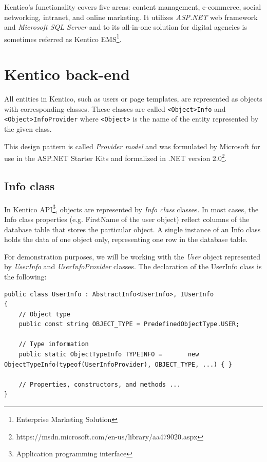 \documentclass[
  print,
  table,
  nolof,
  nolot,
  nocover,
  oneside
]{fithesis3}
\begin{document}
Kentico's functionality covers five areas: content management, e-commerce, social networking, intranet, and online marketing. It utilizes \textit{ASP.NET} web framework and \textit{Microsoft SQL Server} and to its all-in-one solution for digital agencies is sometimes referred as Kentico EMS\footnote{Enterprise Marketing Solution}.


\section{Kentico back-end}
\label{kentico back-end}

All entities in Kentico, such as users or page templates, are represented as objects with corresponding classes. These classes are called \texttt{<Object>Info} and \texttt{<Object>InfoProvider} where \texttt{<Object>} is the name of the entity represented by the given class.

This design pattern is called \textit{Provider model}\parencite{asp_net} and was formulated by Microsoft for use in the ASP.NET Starter Kits and formalized in .NET version 2.0\footnote{https://msdn.microsoft.com/en-us/library/aa479020.aspx}.


\subsection{Info class}
\label{info class}

In Kentico API\footnote{Application programming interface}, objects are represented by \textit{Info class} classes. In most cases, the Info class properties (e.g. FirstName of the user object) reflect columns of the database table that stores the particular object. A single instance of an Info class holds the data of one object only, representing one row in the database table.

For demonstration purposes, we will be working with the \textit{User} object represented by \textit{UserInfo} and \textit{UserInfoProvider} classes. The declaration of the UserInfo class is the following:
\begin{lstlisting}
public class UserInfo : AbstractInfo<UserInfo>, IUserInfo
{
    // Object type
    public const string OBJECT_TYPE = PredefinedObjectType.USER;

    // Type information
    public static ObjectTypeInfo TYPEINFO =       new ObjectTypeInfo(typeof(UserInfoProvider), OBJECT_TYPE, ...) { }
    
    // Properties, constructors, and methods ...
}
\end{lstlisting}
\end{document}
